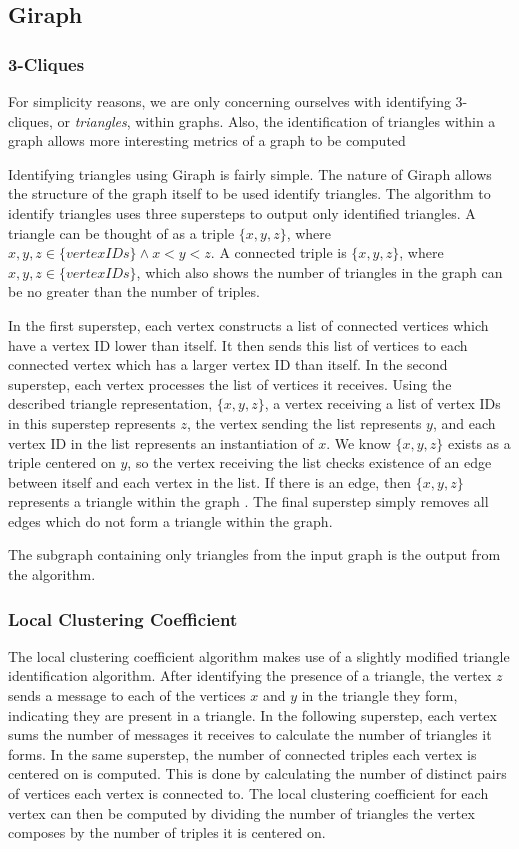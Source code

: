 \subsection{Giraph}

\subsubsection{3-Cliques}
For simplicity reasons, we are only concerning ourselves with identifying 3-cliques, or \emph{triangles}, within graphs. Also, the identification of triangles within a graph allows more interesting metrics of a graph to be computed

Identifying triangles using Giraph is fairly simple. The nature of Giraph allows the structure of the graph itself to be used identify triangles. The algorithm to identify triangles uses three supersteps to output only identified triangles. A triangle can be thought of as a triple $\{x, y, z\}$, where $x, y, z \in \{vertex IDs\} \land x < y < z$. A connected triple is $\{x, y, z\}$, where $x, y, z \in \{vertex IDs\}$, which also shows the number of triangles in the graph can be no greater than the number of triples.

In the first superstep, each vertex constructs a list of connected vertices which have a vertex ID lower than itself. It then sends this list of vertices to each connected vertex which has a larger vertex ID than itself. In the second superstep, each vertex processes the list of vertices it receives. Using the described triangle representation, $\{x, y, z\}$, a vertex receiving a list of vertex IDs in this superstep represents $z$, the vertex sending the list represents $y$, and each vertex ID in the list represents an instantiation of $x$. We know $\{x, y, z\}$ exists as a triple centered on $y$, so the vertex receiving the list checks existence of an edge between itself and each vertex in the list. If there is an edge, then $\{x, y, z\}$ represents a triangle within the graph \cite{cetindil11}. The final superstep simply removes all edges which do not form a triangle within the graph.

The subgraph containing only triangles from the input graph is the output from the algorithm.

\subsubsection{Local Clustering Coefficient}
The local clustering coefficient algorithm makes use of a slightly modified triangle identification algorithm. After identifying the presence of a triangle, the vertex $z$ sends a message to each of the vertices $x$ and $y$ in the triangle they form, indicating they are present in a triangle. In the following superstep, each vertex sums the number of messages it receives to calculate the number of triangles it forms. In the same superstep, the number of connected triples each vertex is centered on is computed. This is done by calculating the number of distinct pairs of vertices each vertex is connected to. The local clustering coefficient for each vertex can then be computed by dividing the number of triangles the vertex composes by the number of triples it is centered on.


